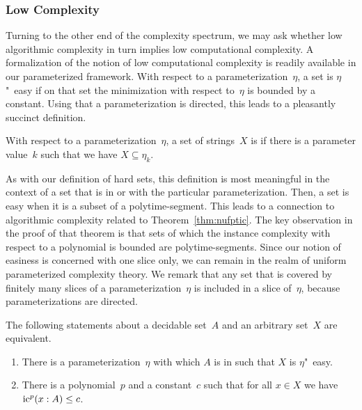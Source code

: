 \subsubsection{Low Complexity}
Turning to the other end of the complexity spectrum, we may ask whether low algorithmic complexity in turn implies low computational complexity.
A formalization of the notion of low computational complexity is readily available in our parameterized framework.
With respect to a parameterization~$\eta$, a set is $\eta$"~easy if on that set the minimization with respect to~$\eta$ is bounded by a constant.
Using that a parameterization is directed, this leads to a pleasantly succinct definition.
\begin{definition}
\label{def:easy}%
  With respect to a parameterization~$\eta$, a set of strings~$X$ is  if there is a parameter value~$k$ such that we have $X \subseteq \eta_k$.
\end{definition}
As with our definition of hard sets, this definition is most meaningful in the context of a set that is in  or  with the particular parameterization.
Then, a set is easy when it is a subset of a polytime-segment.
This leads to a connection to algorithmic complexity related to Theorem~\ref{thm:nufptic}.
The key observation in the proof of that theorem is that sets of which the instance complexity with respect to a polynomial is bounded are polytime-segments.
Since our notion of easiness is concerned with one slice only, we can remain in the realm of uniform parameterized complexity theory.
We remark that any set that is covered by finitely many slices of a parameterization~$\eta$ is included in a slice of~$\eta$, because parameterizations are directed.
\begin{theorem}
  The following statements about a decidable set~$A$ and an arbitrary set~$X$ are equivalent.
  \begin{enumerate}
  \item\label{enum:easy:easy}
    There is a parameterization~$\eta$ with which $A$ is in  such that $X$ is $\eta$"~easy.
  \item\label{enum:easy:ic}
    There is a polynomial~$p$ and a constant~$c$ such that for all $x \in X$ we have $\operatorname{ic}^p(x : A) \le c$.
  \end{enumerate}
\end{theorem}
